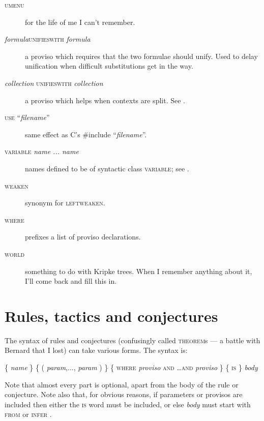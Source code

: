 \begin{description}
\item[\textsc{umenu}] for the life of me I can't remember.
     
\item[\textit{formula}\textsc{unifieswith} \textit{formula}] a proviso which requires that the two formulae should unify. Used to delay unification when difficult substitutions get in the way.


\item[\textit{collection} \textsc{unifieswith} \textit{collection}] a proviso which helps when contexts are split. See .

\item[\textsc{use} ``\textit{filename}''] same effect as C's \#include ``\textit{filename}''.

\item[\textsc{variable} \textit{name ... name}] names defined to be of syntactic class \textsc{variable}; see .

\item[\textsc{weaken}] synonym for \textsc{leftweaken}.

\item[\textsc{where}] prefixes a list of proviso declarations.

\item[\textsc{world}] something to do with Kripke trees. When I remember anything about it, I'll come back and fill this in.

\end{description}
 
\section{Rules, tactics and conjectures}
\label{sec:paraformlang:rulestacticsconjectures}

The syntax of rules and conjectures (confusingly called \textsc{theorem}s --- a battle with Bernard that I lost) can take various forms. The syntax is:

\{ \textit{name} \} \{ ( \textit{param},..., \textit{param} ) \} \{ \textsc{where} \textit{proviso} \textsc{and \dots and} \textit{proviso} \} \{ \textsc{is} \} \textit{body}

Note that almost every part is optional, apart from the body of the rule or conjecture. Note also that, for obvious reasons, if parameters or provisos are included then either the \textsc{is} word must be included, or else \textit{body} must start with \textsc{from} or \textsc{ infer }.

